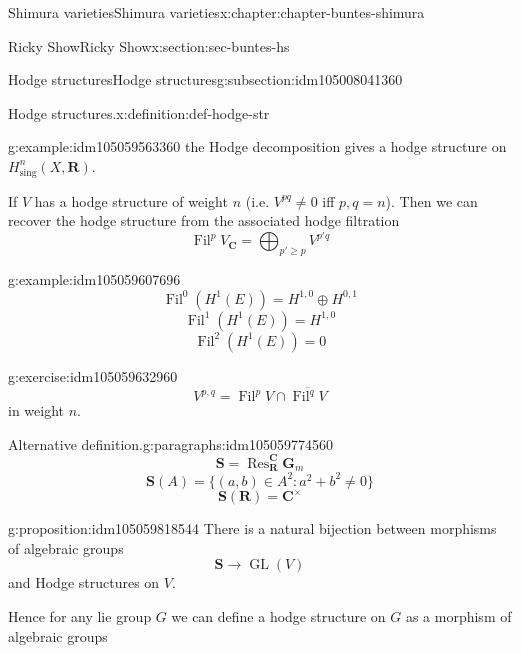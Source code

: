 \documentclass[oneside,10pt,]{book}
\numberwithin{equation}{section}
\newcommand{\RR}{\mathbf{R}}
\newcommand{\CC}{\mathbf{C}}
\DeclareMathOperator{\Fil}{Fil}
\DeclareMathOperator{\Res}{Res}
\DeclareMathOperator{\GL}{GL}
\begin{document}
\begin{chapterptx}{Shimura varieties}{}{Shimura varieties}{}{}{x:chapter:chapter-buntes-shimura}
\begin{sectionptx}{Ricky Show}{}{Ricky Show}{}{}{x:section:sec-buntes-hs}
\begin{subsectionptx}{Hodge structures}{}{Hodge structures}{}{}{g:subsection:idm105008041360}
\begin{definition}{Hodge structures.}{x:definition:def-hodge-str}
\end{definition}
\begin{example}{}{g:example:idm105059563360}%
the Hodge decomposition gives a hodge structure on \(H^n_{\mathrm{sing}}(X, \RR)\).%
\end{example}
If \(V\) has a hodge structure of weight \(n\) (i.e. \(V^{pq} \ne 0\) iff \(p,q = n\)). Then we can recover the hodge structure from the associated hodge filtration%
\begin{equation*}
\Fil^p V_\CC = \bigoplus_{p' \ge p} V^{p' q}
\end{equation*}
%
\begin{example}{}{g:example:idm105059607696}%
%
\begin{equation*}
\Fil^0(H^1(E)) = H^{1,0} \oplus H^{0,1}
\end{equation*}
%
\begin{equation*}
\Fil^1(H^1(E)) = H^{1,0}
\end{equation*}
%
\begin{equation*}
\Fil^2(H^1(E)) = 0
\end{equation*}
%
\end{example}
\begin{inlineexercise}{}{g:exercise:idm105059632960}%
%
\begin{equation*}
V^{p,q} = \Fil^p V \cap \overline {\Fil^q V}
\end{equation*}
in weight \(n\).%
\end{inlineexercise}
\begin{paragraphs}{Alternative definition.}{g:paragraphs:idm105059774560}%
%
\begin{equation*}
\mathbf S = \Res_\RR^\CC \mathbf G_m
\end{equation*}
%
\begin{equation*}
\mathbf S(A) = \{ (a,b) \in A^2 : a^2+  b^2 \ne 0\}
\end{equation*}
%
\begin{equation*}
\mathbf S(\RR) = \CC^\times
\end{equation*}
%
\begin{proposition}{}{}{g:proposition:idm105059818544}%
There is  a natural bijection between morphisms of algebraic groups%
\begin{equation*}
\mathbf S \to \GL(V)
\end{equation*}
and Hodge structures on \(V\).%
\end{proposition}
Hence for any lie group \(G\) we can define a hodge structure on \(G\) as a morphism of algebraic groups%
\begin{equation*}

\end{equation*}
\end{paragraphs}
\end{subsectionptx}
\end{sectionptx}
\end{chapterptx}
\end{document}
